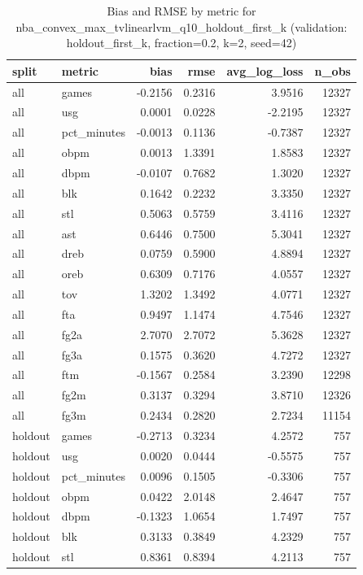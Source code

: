 \begin{table}
\caption{Bias and RMSE by metric for nba_convex_max_tvlinearlvm_q10_holdout_first_k (validation: holdout_first_k, fraction=0.2, k=2, seed=42)}
\label{tab:nba_convex_max_tvlinearlvm_q10_holdout_first_k_vs_holdout_first_k_f20_k2_s42_bias_rmse}
\begin{tabular}{llrrrr}
\toprule
split & metric & bias & rmse & avg\_log\_loss & n\_obs \\
\midrule
all & games & -0.2156 & 0.2316 & 3.9516 & 12327 \\
all & usg & 0.0001 & 0.0228 & -2.2195 & 12327 \\
all & pct\_minutes & -0.0013 & 0.1136 & -0.7387 & 12327 \\
all & obpm & 0.0013 & 1.3391 & 1.8583 & 12327 \\
all & dbpm & -0.0107 & 0.7682 & 1.3020 & 12327 \\
all & blk & 0.1642 & 0.2232 & 3.3350 & 12327 \\
all & stl & 0.5063 & 0.5759 & 3.4116 & 12327 \\
all & ast & 0.6446 & 0.7500 & 5.3041 & 12327 \\
all & dreb & 0.0759 & 0.5900 & 4.8894 & 12327 \\
all & oreb & 0.6309 & 0.7176 & 4.0557 & 12327 \\
all & tov & 1.3202 & 1.3492 & 4.0771 & 12327 \\
all & fta & 0.9497 & 1.1474 & 4.7546 & 12327 \\
all & fg2a & 2.7070 & 2.7072 & 5.3628 & 12327 \\
all & fg3a & 0.1575 & 0.3620 & 4.7272 & 12327 \\
all & ftm & -0.1567 & 0.2584 & 3.2390 & 12298 \\
all & fg2m & 0.3137 & 0.3294 & 3.8710 & 12326 \\
all & fg3m & 0.2434 & 0.2820 & 2.7234 & 11154 \\
holdout & games & -0.2713 & 0.3234 & 4.2572 & 757 \\
holdout & usg & 0.0020 & 0.0444 & -0.5575 & 757 \\
holdout & pct\_minutes & 0.0096 & 0.1505 & -0.3306 & 757 \\
holdout & obpm & 0.0422 & 2.0148 & 2.4647 & 757 \\
holdout & dbpm & -0.1323 & 1.0654 & 1.7497 & 757 \\
holdout & blk & 0.3133 & 0.3849 & 4.2329 & 757 \\
holdout & stl & 0.8361 & 0.8394 & 4.2113 & 757 \\

\end{tabular}
\end{table}
